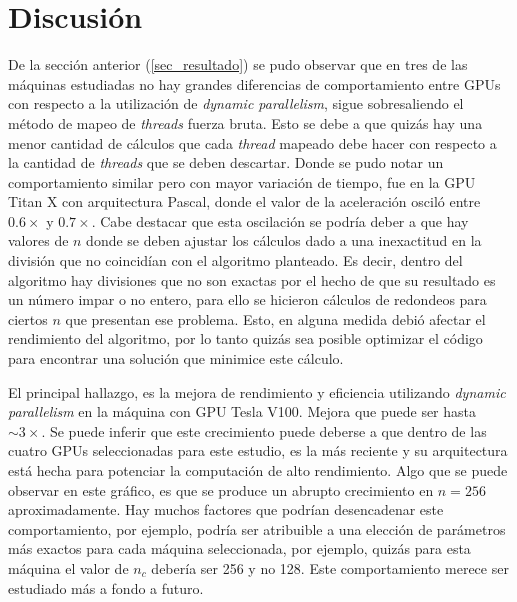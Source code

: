\documentclass[10pt, conference, compsocconf, onecolumn]{IEEEtran}
\begin{document}
 




\section{Discusi\'on}
\label{sec_discusion}

 
De la secci\'on anterior (\ref{sec_resultado}) se pudo observar que en tres de las m\'aquinas estudiadas no hay grandes diferencias de comportamiento entre GPUs con respecto a la utilizaci\'on de \textit{dynamic parallelism}, sigue sobresaliendo el m\'etodo de mapeo de \textit{threads} fuerza bruta. Esto se debe a que quiz\'as hay una menor cantidad de c\'alculos que cada \textit{thread} mapeado debe hacer con respecto a la cantidad de \textit{threads} que se deben descartar. Donde se pudo notar un comportamiento similar pero con mayor variaci\'on de tiempo, fue en la GPU Titan X con arquitectura Pascal, donde el valor de la aceleraci\'on oscil\'o entre $0.6\times$ y $0.7\times$. Cabe destacar que esta oscilaci\'on se podr\'ia deber a que hay valores de $n$ donde se deben ajustar los c\'alculos dado a una inexactitud en la divisi\'on que no coincid\'ian con el algoritmo planteado. Es decir, dentro del algoritmo hay divisiones que no son exactas por el hecho de que su resultado es un n\'umero impar o no entero, para ello se hicieron c\'alculos de redondeos para ciertos $n$ que presentan ese problema. Esto, en alguna medida debi\'o afectar el rendimiento del algoritmo, por lo tanto quiz\'as sea posible optimizar el c\'odigo para encontrar una soluci\'on que minimice este c\'alculo.
  
 El principal hallazgo, es la mejora de rendimiento y eficiencia utilizando \textit{dynamic parallelism} en la m\'aquina con GPU Tesla V100. Mejora que puede ser hasta  $\sim 3\times$. Se puede inferir que este crecimiento puede deberse a que dentro de las cuatro GPUs seleccionadas para este estudio, es la m\'as reciente y su arquitectura est\'a hecha para potenciar la computaci\'on de alto rendimiento. Algo que se puede observar en este gr\'afico, es que se produce un abrupto crecimiento en $n=256$ aproximadamente. Hay muchos factores que podr\'ian desencadenar este comportamiento, por ejemplo, podr\'ia ser atribuible a una elecci\'on de par\'ametros m\'as exactos para cada m\'aquina seleccionada, por ejemplo, quiz\'as para esta m\'aquina el valor de $n_{c}$ deber\'ia ser 256 y no 128. Este comportamiento merece ser estudiado m\'as a fondo a futuro.
 
\end{document}
